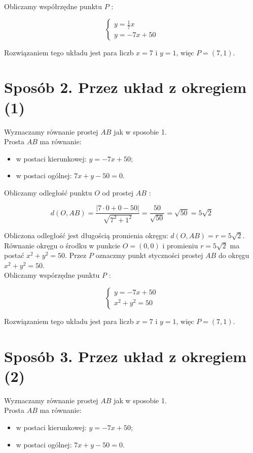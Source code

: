 \documentclass[10pt]{article}
\begin{document}
Obliczamy współrzędne punktu $P$ :

$$
\left\{\begin{array}{l}
y=\frac{1}{7} x \\
y=-7 x+50
\end{array}\right.
$$

Rozwiązaniem tego układu jest para liczb $x=7$ i $y=1$, więc $P=(7,1)$.

\section*{Sposób 2. Przez układ z okregiem (1)}
Wyznaczamy równanie prostej $A B$ jak w sposobie 1.\\
Prosta $A B$ ma równanie:

\begin{itemize}
  \item w postaci kierunkowej: $y=-7 x+50$;
  \item w postaci ogólnej: $7 x+y-50=0$.
\end{itemize}

Obliczamy odległość punktu $O$ od prostej $A B$ :

$$
d(O, A B)=\frac{|7 \cdot 0+0-50|}{\sqrt{7^{2}+1^{2}}}=\frac{50}{\sqrt{50}}=\sqrt{50}=5 \sqrt{2}
$$

Obliczona odległość jest długością promienia okręgu: $d(O, A B)=r=5 \sqrt{2}$.\\
Równanie okręgu o środku w punkcie $O=(0,0)$ i promieniu $r=5 \sqrt{2}$ ma postać $x^{2}+y^{2}=50$. Przez $P$ oznaczmy punkt styczności prostej $A B$ do okręgu $x^{2}+y^{2}=50$.\\
Obliczamy wspórzędne punktu $P$ :

$$
\left\{\begin{array}{l}
y=-7 x+50 \\
x^{2}+y^{2}=50
\end{array}\right.
$$

Rozwiązaniem tego układu jest para liczb $x=7$ i $y=1$, więc $P=(7,1)$.

\section*{Sposób 3. Przez układ z okregiem (2)}
Wyznaczamy równanie prostej $A B$ jak w sposobie 1.\\
Prosta $A B$ ma równanie:

\begin{itemize}
  \item w postaci kierunkowej: $y=-7 x+50$;
  \item w postaci ogólnej: $7 x+y-50=0$.
\end{itemize}
\end{document}
